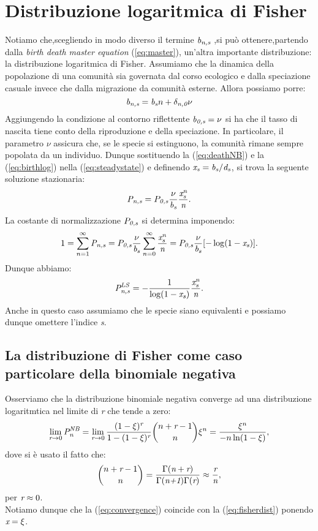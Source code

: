 \section{Distribuzione logaritmica di Fisher}
Notiamo che,scegliendo in modo diverso il termine $\emph{b}_\emph{n,s}$ ,si può ottenere,partendo dalla \emph{birth death master equation} (\ref{eq:master}), un'altra importante distribuzione: la distribuzione logaritmica di Fisher.
Assumiamo che la dinamica della popolazione di una comunità sia governata dal corso ecologico e dalla speciazione casuale invece che dalla migrazione da comunità esterne.
Allora possiamo porre:
\begin{equation}
    \emph{b}_\emph{n,s}=\emph{b}_\emph{s}n+\delta_\emph{n,0}\nu
\label{eq:birthlog}
\end{equation}
Aggiungendo la condizione al contorno riflettente $\emph{b}_\emph{0,s}=\nu$ si ha che il tasso di nascita tiene conto della riproduzione e della speciazione. In particolare, il parametro $\nu$ assicura che, se le specie si estinguono, la comunità rimane sempre popolata da un individuo.
Dunque sostituendo la (\ref{eq:deathNB}) e la (\ref{eq:birthlog}) nella (\ref{eq:steadystate}) e definendo $\emph{x}_\emph{s}=\emph{b}_\emph{s}/\emph{d}_\emph{s}$, si trova la seguente soluzione stazionaria:
\begin{equation}
    \emph{P}_\emph{n,s}=P_\emph{0,s}\frac{\nu}{\emph{b}_\emph{s}}\frac{\emph{x}_\emph{s}^{\emph{n}}}{\emph{n}}.
\end{equation}
La costante di normalizzazione $P_\emph{0,s}$ si determina imponendo:
$$
1=\sum_{n=1}^\infty \emph{P}_{\emph{n,s}}=P_\emph{0,s}\frac{\nu}{\emph{b}_\emph{s}}\sum_{n=0}^\infty\frac{\emph{x}_\emph{s}^{\emph{n}}}{\emph{n}}=P_\emph{0,s}\frac{\nu}{\emph{b}_\emph{s}}[-\log(1-\emph{x}_\emph{s})].
$$
Dunque abbiamo:
\begin{equation}
    \emph{P}_\emph{n,s}^{\emph{LS}}=-\frac{1}{\log(1-\emph{x}_\emph{s})}\frac{\emph{x}_\emph{s}^{\emph{n}}}{\emph{n}}.
\label{eq:fisherdist}
\end{equation}
Anche in questo caso assumiamo che le specie siano equivalenti e possiamo dunque omettere l'indice \emph{s}.

\subsection{La distribuzione di Fisher come caso particolare della binomiale negativa}
Osserviamo che la distribuzione binomiale negativa converge ad una distribuzione logaritmtica nel limite di \emph{r} che tende a zero:
\begin{equation}
    \lim_{\emph{r} \to 0}\emph{P}_\emph{n}^{\emph{NB}}= \lim_{\emph{r}\to0}\frac{(1-\xi)^{\emph{r}}}{1-(1-\xi)^{\emph{r}}}\binom{n+\emph{r}-1}{n}\xi^n=\frac{\xi^n}{-n\ln(1-\xi)},
\label{eq:convergence}
\end{equation}
dove si è usato il fatto che:
$$
\binom{n+\emph{r}-1}{n}=\frac{\Gamma(\emph{n}+\emph{r})}{\Gamma(\emph{n+1})\Gamma(\emph{r})} \approx\frac{\emph{r}}{\emph{n}},
$$
per $\emph{r}\approx 0$.\\
Notiamo dunque che la (\ref{eq:convergence}) coincide con la (\ref{eq:fisherdist}) ponendo  $\emph{x}=\xi$.



